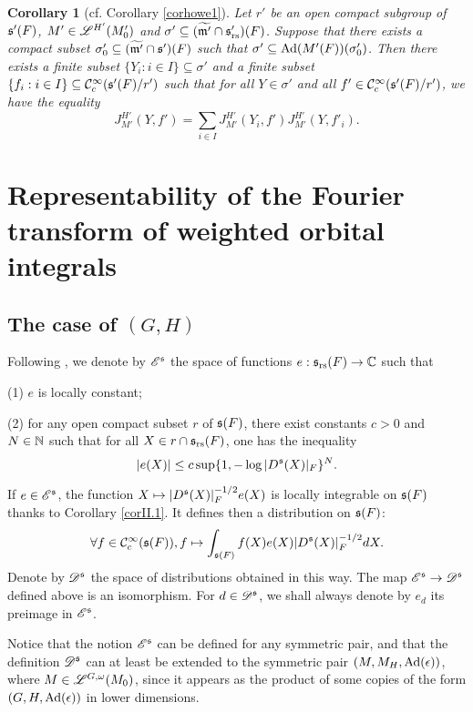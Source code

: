 \documentclass[a4paper]{amsart}
\newcommand{\mse}{\mathscr{E}}\newcommand{\msf}{\mathscr{F}}\newcommand{\msg}{\mathscr{G}}\newcommand{\msh}{\mathscr{H}}
\newcommand{\fm}{{\mathfrak{m}}} \newcommand{\fn}{{\mathfrak{n}}}\newcommand{\fo}{{\mathfrak{o}}} \newcommand{\fp}{{\mathfrak{p}}}
\newcommand{\wt}{\widetilde}                        \newcommand{\wh}{\widehat}                      \newcommand{\wpair}[1]{\left\{{#1}\right\}}
\newtheorem{coro}[thm]{Corollary}
\theoremstyle{definition}
\theoremstyle{remark}
\numberwithin{equation}{subsection}
\begin{document}
\begin{coro}[cf. Corollary \ref{corhowe1}]\label{corhowe2}
Let $r'$ be an open compact subgroup of ${\mathfrak{s}}'(F)$, $M'\in\mathscr{L}^{H'}(M'_0)$ and $\sigma'\subseteq (\wt{\fm'}\cap\fs'_\rs)(F)$. Suppose that there exists a compact subset $\sigma'_0\subseteq(\wt{\fm'}\cap\fs')(F)$ such that $\sigma'\subseteq {\mathrm{Ad}}(M'(F))(\sigma'_0)$. Then there exists a finite subset $\{Y_i: i\in I\}\subseteq\sigma'$ and a finite subset $\{f_i: i\in I\}\subseteq{\mathcal {C}}_c^\infty({\mathfrak{s}}'(F)/r')$ such that for all $Y\in\sigma'$ and all $f'\in{\mathcal {C}}_c^\infty({\mathfrak{s}}'(F)/r')$, we have the equality
$$ J_{M'}^{H'}(Y, f')=\sum_{i\in I} J_{M'}^{H'}(Y_i, f') J_{M'}^{H'}(Y, f'_i). $$
\end{coro}




\section{\textbf{Representability of the Fourier transform of weighted orbital integrals}}\label{secrep}

\subsection{The case of $(G,H)$}

Following \cite[\S V.6]{MR1344131}, we denote by $\mse^\fs$ the space of functions $e: {\mathfrak{s}}_{\mathrm{rs}}(F)\rightarrow{\mathbb {C}}$ such that

(1) $e$ is locally constant; 

(2) for any open compact subset $r$ of ${\mathfrak{s}}(F)$, there exist constants $c>0$ and $N\in{\mathbb {N}}$ such that for all $X\in r\cap{\mathfrak{s}}_{\mathrm{rs}}(F)$, one has the inequality
$$ |e(X)|\leq c\sup\{1, -\log |D^{\mathfrak{s}}(X)|_F\}^N. $$

If $e\in\mse^\fs$, the function $X\mapsto |D^{\mathfrak{s}}(X)|_F^{-1/2}e(X)$ is locally integrable on ${\mathfrak{s}}(F)$ thanks to Corollary \ref{corII.1}. It defines then a distribution on ${\mathfrak{s}}(F)$:
\begin{equation}\label{defV.6.1}
 \forall f\in{\mathcal {C}}_c^\infty({\mathfrak{s}}(F)), f\mapsto\int_{{\mathfrak{s}}(F)} f(X)e(X)|D^{\mathfrak{s}}(X)|_F^{-1/2}dX. 
\end{equation}
Denote by $\mathscr{D}^{\mathfrak{s}}$ the space of distributions obtained in this way. The map $\mse^\fs\ra\msd^\fs$ defined above is an isomorphism. For $d\in\mathscr{D}^{\mathfrak{s}}$, we shall always denote by $e_d$ its preimage in $\mse^\fs$. 

Notice that the notion $\mse^\fs$ can be defined for any symmetric pair, and that the definition $\mathscr{D}^{\mathfrak{s}}$ can at least be extended to the symmetric pair $(M, M_H, {\mathrm{Ad}}(\epsilon))$, where $M\in\mathscr{L}^{G,\omega}(M_0)$, since it appears as the product of some copies of the form $(G, H, {\mathrm{Ad}}(\epsilon))$ in lower dimensions. 
\end{document}
